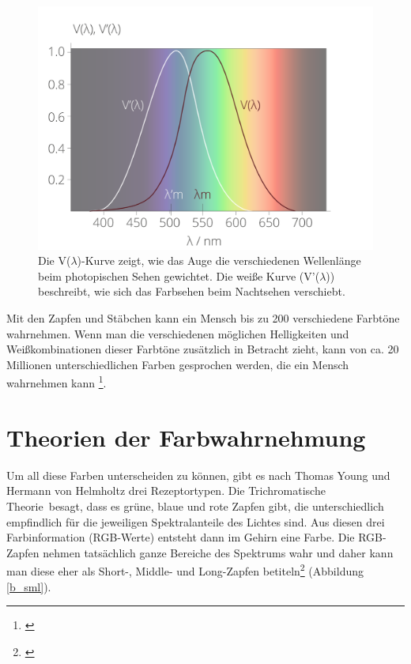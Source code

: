 \begin{figure}[H]     %
\centering
\includegraphics[width=1.0\textwidth]{bilder/augespek} 
\caption {Die V($\lambda$)-Kurve zeigt, wie das Auge die verschiedenen Wellenlänge beim photopischen Sehen gewichtet. Die weiße Kurve (V'($\lambda$)) beschreibt, wie sich das Farbsehen beim Nachtsehen verschiebt\protect\footnotemark .}\label{b_augespek}
\end{figure}


\noindent Mit den Zapfen und Stäbchen kann ein Mensch bis zu 200 verschiedene Farbtöne wahrnehmen. Wenn man die verschiedenen möglichen Helligkeiten und Weißkombinationen dieser Farbtöne zusätzlich in Betracht zieht, kann von ca. 20 Millionen unterschiedlichen Farben gesprochen werden, die ein Mensch wahrnehmen kann \footnote{\cite{unimann}}.

\newpage
\section{Theorien der Farbwahrnehmung}
\label{sec_colour}
 
Um all diese Farben unterscheiden zu können, gibt es nach Thomas Young und Hermann von Helmholtz drei Rezeptortypen. Die \glqq Trichromatische Theorie\grqq\ besagt, dass es grüne, blaue und rote Zapfen gibt, die unterschiedlich empfindlich für die jeweiligen Spektralanteile des Lichtes sind. Aus diesen drei Farbinformation (RGB-Werte) entsteht dann im Gehirn eine Farbe. Die RGB-Zapfen nehmen tatsächlich ganze Bereiche des Spektrums wahr und daher kann man diese eher als Short-, Middle- und Long-Zapfen betiteln\footnote{\cite[62-63]{greule}} (Abbildung \ref{b_sml}).

